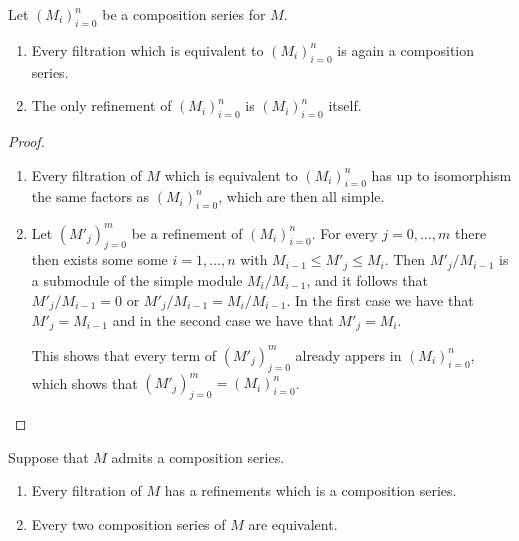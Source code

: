 \begin{lemma}
  \label{lemma: preparation for jordan hoelder}
  Let $(M_i)_{i=0}^n$ be a composition series for $M$.
  \begin{enumerate}
    \item
      Every filtration which is equivalent to $(M_i)_{i=0}^n$ is again a composition series.
    \item
      The only refinement of $(M_i)_{i=0}^n$ is $(M_i)_{i=0}^n$ itself.
  \end{enumerate}
\end{lemma}


\begin{proof}
  \leavevmode
  \begin{enumerate}
    \item
      Every filtration of $M$ which is equivalent to $(M_i)_{i=0}^n$ has up to isomorphism the same factors as $(M_i)_{i=0}^n$, which are then all simple.
    \item
      Let $(M'_j)_{j=0}^m$ be a refinement of $(M_i)_{i=0}^n$.
      For every $j = 0, \dotsc, m$ there then exists some some $i = 1, \dotsc, n$ with $M_{i-1} \leq M'_j \leq M_i$.
      Then $M'_j/M_{i-1}$ is a submodule of the simple module $M_i/M_{i-1}$, and it follows that $M'_j/M_{i-1} = 0$ or $M'_j/M_{i-1} = M_i/M_{i-1}$.
      In the first case we have that $M'_j = M_{i-1}$ and in the second case we have that $M'_j = M_i$.
      
      This shows that every term of $(M'_j)_{j=0}^m$ already appers in $(M_i)_{i=0}^n$, which shows that $(M'_j)_{j=0}^m = (M_i)_{i=0}^n$.
    \qedhere
  \end{enumerate}
\end{proof}


\begin{theorem}
  \label{theorem: jordan hoelder theorem}
  Suppose that $M$ admits a composition series.
  \begin{enumerate}
    \item
      Every filtration of $M$ has a refinements which is a composition series.
    \item
      Every two composition series of $M$ are equivalent.
  \end{enumerate}
\end{theorem}


